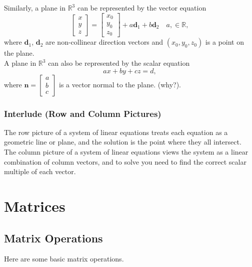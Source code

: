 \documentclass[11pt]{scrartcl}
\theoremstyle{plain}
\theoremstyle{definition}
\theoremstyle{remark}
\begin{document}
Similarly, a plane in $\mathbb{R}^{3}$ can be represented by the vector equation
\[ \begin{bmatrix}x \\ y \\z\end{bmatrix}=\begin{bmatrix}x_{0} \\ y_{0} \\z_{0}\end{bmatrix}+a\mathbf{d}_{1}+
b\mathbf{d}_{2}\quad a,\in \mathbb{R}, \]
where $\mathbf{d}_{1}$, $\mathbf{d}_{2}$ are non-collinear direction vectors and $(x_{0},y_{0},z_{0})$ is a point 
on the plane. \\[-0.5em]

A plane in $\mathbb{R}^{3}$ can also be represented by the scalar equation
\[ ax+by+cz=d, \]
where $\mathbf{n}=\begin{bmatrix}a \\ b \\ c\end{bmatrix}$ is a vector normal to the plane. (why?).

\subsubsection{Interlude (Row and Column Pictures)}

The row picture of a system of linear equations treats each equation as a geometric line or plane, and the solution 
is the point where they all intersect. \\[-0.5em]

The column picture of a system of linear equations views the system as a linear combination of column vectors, and 
to solve you need to find the correct scalar multiple of each vector. 

\newpage
\section{Matrices}
\subsection{Matrix Operations}

Here are some basic matrix operations.
\end{document}
